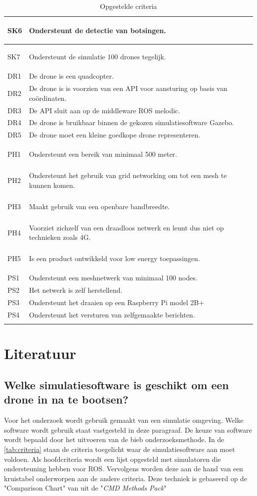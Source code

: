 \documentclass[a4paper, 11pt, oneside]{report}
\begin{document}
\begin{longtable}{|l|l|l|}
		\hypertarget{sk6}{SK6}		& Ondersteunt de detectie van botsingen.        \\ \hline
		\hypertarget{sk7}{SK7}		& Ondersteunt de simulatie 100 drones tegelijk.        \\ \hline
		DR1		& De drone is een quadcopter.        \\ \hline
		DR2		& De drone is is voorzien van een API voor aansturing op basis van coördinaten.       \\ \hline
		DR3		& De API sluit aan op de middleware ROS melodic.        \\ \hline
		DR4		& De drone is bruikbaar binnen de gekozen simulatiesoftware Gazebo.        \\ \hline
		DR5		& De drone moet een kleine goedkope drone representeren.        \\ \hline
		\hypertarget{ph1}{PH1}		& Ondersteunt een bereik van minimaal 500 meter.  \\ \hline
		\hypertarget{ph2}{PH2}		& Ondersteunt het gebruik van grid networking om tot een mesh te kunnen komen.  \\ \hline
		\hypertarget{ph3}{PH3}		& Maakt gebruik van een openbare bandbreedte.\\ \hline
		\hypertarget{ph4}{PH4}		& Voorziet zichzelf van een draadloos netwerk en leunt dus niet op technieken zoals 4G.\\ \hline
		\hypertarget{ph5}{PH5}		& Is een product ontwikkeld voor low energy toepassingen. \\ \hline
		PS1		& Ondersteunt een meshnetwerk van minimaal 100 nodes. \\ \hline
		PS2		& Het netwerk is zelf herstellend. \\ \hline
		PS3		& Ondersteunt het draaien op een Raspberry Pi model 2B+ \\ \hline
		PS4		& Ondersteunt het versturen van zelfgemaakte berichten. \\ \hline
		
	\caption{Opgestelde criteria}
	\label{tab:criteria}
\end{longtable}

\chapter{Literatuur}


\section[Welke simulatiesoftware?]{Welke simulatiesoftware is geschikt om een drone in na te bootsen?}
\label{sec:welkesim}
Voor het onderzoek wordt gebruik gemaakt van een simulatie omgeving.
Welke software wordt gebruik staat vastgesteld in deze paragraaf.
De keuze van software wordt bepaald door het uitvoeren van de bieb onderzoeksmethode. 
In de \autoref{tab:criteria} staan de criteria toegelicht waar de simulatiesoftware aan moet voldoen.
Als hoofdcriteria wordt een lijst opgesteld met simulatoren die ondersteuning hebben voor ROS.
Vervolgens worden deze aan de hand van een kruistabel onderworpen aan de andere criteria.
Deze techniek is gebaseerd op de "Comparison Chart" van \cite{CMDmethod} uit de "\textit{CMD Methods Pack}"
\end{document}
